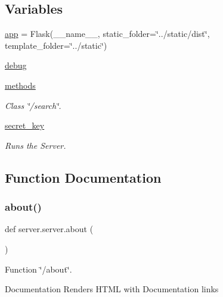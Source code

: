 \subsection*{Variables}
\begin{DoxyCompactItemize}
\item 
\mbox{\hyperlink{namespaceserver_1_1server_abe540ab6e7c9bffd61dda91273e699e2}{app}} = Flask(\+\_\+\+\_\+name\+\_\+\+\_\+, static\+\_\+folder=\char`\"{}../static/dist\char`\"{}, template\+\_\+folder=\char`\"{}../static\char`\"{})
\item 
\mbox{\hyperlink{namespaceserver_1_1server_addf5a8b97b626d4622f3fb2b2f8065ab}{debug}}
\item 
\mbox{\hyperlink{namespaceserver_1_1server_a1e0984522028dec04483b66d00e8b6b6}{methods}}
\begin{DoxyCompactList}\small\item\em Class \char`\"{}/search\char`\"{}. \end{DoxyCompactList}\item 
\mbox{\hyperlink{namespaceserver_1_1server_a70d8440bb9056abff06b917ecacce061}{secret\+\_\+key}}
\begin{DoxyCompactList}\small\item\em Runs the Server. \end{DoxyCompactList}\end{DoxyCompactItemize}


\subsection{Function Documentation}
\mbox{\label{namespaceserver_1_1server_a7bdc96668852473d18262dd1185ac3d9}} 
\subsubsection{\texorpdfstring{about()}{about()}}
{\footnotesize\ttfamily def server.\+server.\+about (\begin{DoxyParamCaption}{ }\end{DoxyParamCaption})}



Function \char`\"{}/about\char`\"{}. 

Documentation Renders H\+T\+ML with Documentation links \mbox{\label{namespaceserver_1_1server_a06b6b48a36458a5e63d37667433c2080}} 

